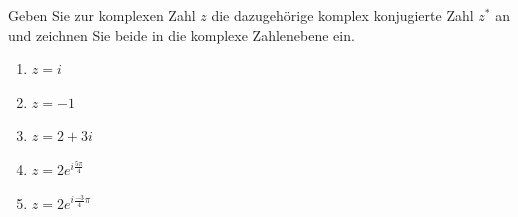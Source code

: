 \begin{ExerciseBlock}
Geben Sie zur komplexen Zahl $z$ die dazugehörige komplex konjugierte Zahl $z^*$ an und zeichnen Sie beide in die komplexe Zahlenebene ein.
\begin{enumerate}[label=\alph*)]
	\item $z = i$
	\item $z = -1$
	\item $z = 2 + 3i$
	\item $z = 2 e^{i \frac{5\pi}{4}}$
	\item $z = 2 e^{i \frac{-3}{4}\pi}$
\end{enumerate}

\end{ExerciseBlock}
